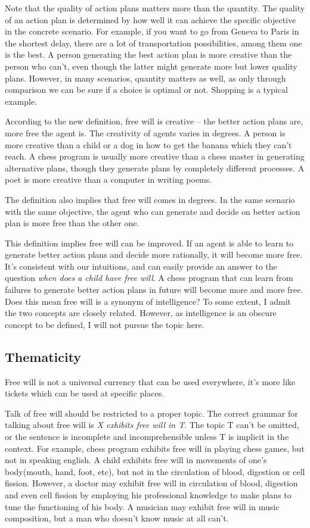 Note that the quality of action plans matters more than the quantity. The quality of an action plan is determined by how well it can achieve the specific objective in the concrete scenario. For example, if you want to go from Geneva to Paris in the shortest delay, there are a lot of transportation possibilities, among them one is the best. A person generating the best action plan is more creative than the person who can’t, even though the latter might generate more but lower quality plans. However, in many scenarios, quantity matters as well, as only through comparison we can be sure if a choice is optimal or not. Shopping is a typical example.

According to the new definition, free will is creative -- the better action plans are, more free the agent is. The creativity of agents varies in degrees. A person is more creative than a child or a dog in how to get the banana which they can’t reach. A chess program is usually more creative than a chess master in generating alternative plans, though they generate plans by completely different processes. A poet is more creative than a computer in writing poems.

The definition also implies that free will comes in degrees. In the same scenario with the same objective, the agent who can generate and decide on better action plan is more free than the other one.

This definition implies free will can be improved. If an agent is able to learn to generate better action plans and decide more rationally, it will become more free. It’s consistent with our intuitions, and can easily provide an answer to the question \emph{when does a child have free will}. A chess program that can learn from failures to generate better action plans in future will become more and more free. Does this mean free will is a synonym of intelligence? To some extent, I admit the two concepts are closely related. However, as intelligence is an obscure concept to be defined, I will not pursue the topic here.

\subsection{Thematicity}

Free will is not a universal currency that can be used everywhere, it's more like tickets which can be used at specific places.

Talk of free will should be restricted to a proper topic. The correct grammar for talking about free will is \emph{X exhibits free will in T}. The topic T can’t be omitted, or the sentence is incomplete and incomprehensible unless T is implicit in the context. For example, chess program exhibits free will in playing chess games, but not in speaking english. A child exhibits free will in movements of one’s body(mouth, hand, foot, etc), but not in the circulation of blood, digestion or cell fission. However, a doctor may exhibit free will in circulation of blood, digestion and even cell fission by employing his professional knowledge to make plans to tune the functioning of his body. A musician may  exhibit free will in music composition, but a man who doesn’t know music at all can’t.

